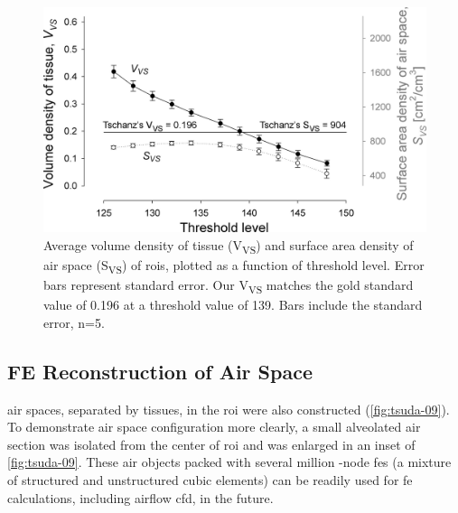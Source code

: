 \renewcommand{\imsize}{\linewidth}
\begin{figure}
	\centering
	\includegraphics[width=\imsize]{img/Tsuda2008/Tsuda-08}
	\caption[Average volume density of tissue and surface area density of air space]{Average volume density of tissue (V\textsubscript{VS}) and surface area density of air space (S\textsubscript{VS}) of \acp{roi}, plotted as a function of threshold level. Error bars represent standard error. Our V\textsubscript{VS} matches the gold standard value of 0.196 at a threshold value of 139. Bars include the standard error, n=5.}
	\label{fig:VVSplot}
\end{figure}

\subsection{FE \threed Reconstruction of Air Space}
\threed air spaces, separated by tissues, in the \ac{roi} were also constructed (\autoref{fig:tsuda-09}). To demonstrate air space configuration more clearly, a small alveolated air section was isolated from the center of \ac{roi} and was enlarged in an inset of \autoref{fig:tsuda-09}. These \threed air objects packed with several million -node \acp{fe} (a mixture of structured and unstructured cubic elements) can be readily used for \ac{fe} calculations, including airflow \ac{cfd}, in the future.

